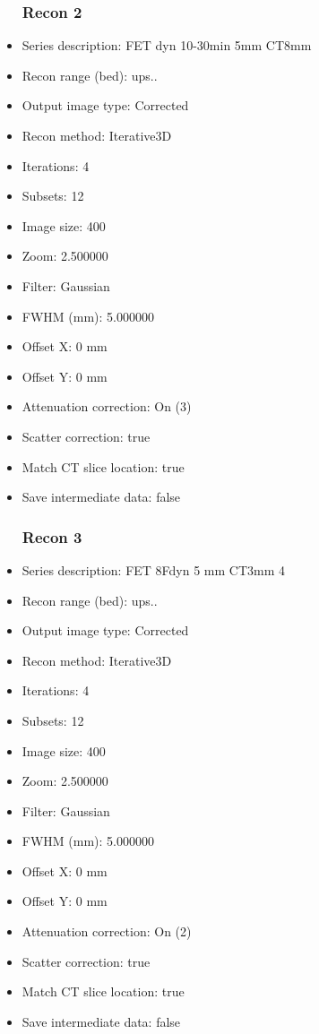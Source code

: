 \documentclass[12pt]{article}
\begin{document}
\begin{itemize}
\subsubsection{Recon 2}
\item Series description: FET dyn 10-30min 5mm CT8mm
\item Recon range (bed): ups..
\item Output image type: Corrected
\item Recon method: Iterative3D
\item Iterations: 4
\item Subsets: 12
\item Image size: 400
\item Zoom: 2.500000
\item Filter: Gaussian
\item FWHM (mm): 5.000000
\item Offset X: 0 mm
\item Offset Y: 0 mm
\item Attenuation correction: On (3)
\item Scatter correction: true
\item Match CT slice location: true
\item Save intermediate data: false
\subsubsection{Recon 3}
\item Series description: FET 8Fdyn 5 mm CT3mm 4
\item Recon range (bed): ups..
\item Output image type: Corrected
\item Recon method: Iterative3D
\item Iterations: 4
\item Subsets: 12
\item Image size: 400
\item Zoom: 2.500000
\item Filter: Gaussian
\item FWHM (mm): 5.000000
\item Offset X: 0 mm
\item Offset Y: 0 mm
\item Attenuation correction: On (2)
\item Scatter correction: true
\item Match CT slice location: true
\item Save intermediate data: false

\end{itemize}
\end{document}
